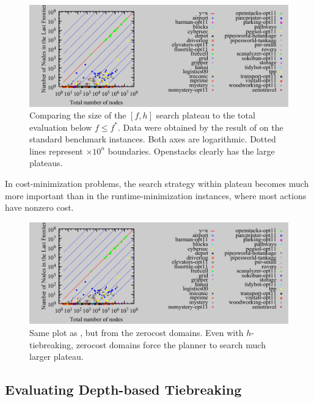\begin{figure}[htb]
 \centering {}
  \includegraphics{tables/aaai16-frontier/aaai16prelim3/lmcut_frontier-front.pdf}
  \caption{Comparing the size of the $[f,h]$ search plateau to the total
  evaluation below $f\leq f^*$. Data were obtained by the result of
  \lmcut on the standard benchmark instances. Both axes are
  logarithmic. Dotted lines represent $\times 10^n$ boundaries.
  Openstacks clearly has the large plateaus.}  \label{plateau}
\end{figure}

 In cost-minimization problems, the search
strategy within plateau becomes much more important than in the
runtime-minimization instances, where most actions have nonzero cost.

\begin{figure}[htb]
 \centering {}
  \includegraphics{tables/aaai16-frontier/aaai16prelim3/lmcut_frontier-front.pdf}
  \caption{Same plot as , but from the zerocost
  domains. Even with $h$-tiebreaking, zerocost domains force the planner
  to search much larger plateau.}
 \label{plateau-zerocost}
\end{figure}

\subsection{Evaluating Depth-based Tiebreaking}


